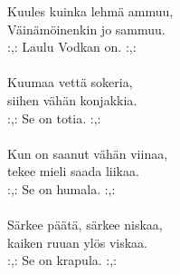 
Kuules kuinka lehmä ammuu, \\ Väinämöinenkin jo sammuu. \\ :,: Laulu Vodkan on. :,: \\ \hspace{10mm} \\ Kuumaa vettä sokeria, \\ siihen vähän konjakkia. \\ :,: Se on totia. :,: \\ \hspace{10mm} \\ Kun on saanut vähän viinaa, \\ tekee mieli saada liikaa. \\ :,: Se on humala. :,: \\ \hspace{10mm} \\ Särkee päätä, särkee niskaa, \\ kaiken ruuan ylös viskaa. \\ :,: Se on krapula. :,: